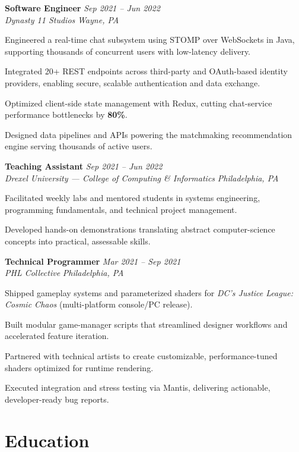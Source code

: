 \documentclass[letterpaper,10pt]{article}
\newcommand{\role}[4]{%
  \textbf{#1} \hfill \textit{#3}\\[-1pt]
  \textit{#2} \hfill \textit{#4}\par\vspace{2pt}
}
\begin{document}
\role{Software Engineer}{Dynasty 11 Studios}{Sep 2021 -- Jun 2022}{Wayne, PA}
\begin{tightitemize}
  \item Engineered a real-time chat subsystem using STOMP over WebSockets in Java, supporting thousands of concurrent users with low-latency delivery.
  \item Integrated 20+ REST endpoints across third-party and OAuth-based identity providers, enabling secure, scalable authentication and data exchange.
  \item Optimized client-side state management with Redux, cutting chat-service performance bottlenecks by \textbf{80\%}.
  \item Designed data pipelines and APIs powering the matchmaking recommendation engine serving thousands of active users.
\end{tightitemize}

\role{Teaching Assistant}{Drexel University --- College of Computing \& Informatics}{Sep 2021 -- Jun 2022}{Philadelphia, PA}
\begin{tightitemize}
  \item Facilitated weekly labs and mentored students in systems engineering, programming fundamentals, and technical project management.
  \item Developed hands-on demonstrations translating abstract computer-science concepts into practical, assessable skills.
\end{tightitemize}

\role{Technical Programmer}{PHL Collective}{Mar 2021 -- Sep 2021}{Philadelphia, PA}
\begin{tightitemize}
  \item Shipped gameplay systems and parameterized shaders for \textit{DC's Justice League: Cosmic Chaos} (multi-platform console/PC release).
  \item Built modular game-manager scripts that streamlined designer workflows and accelerated feature iteration.
  \item Partnered with technical artists to create customizable, performance-tuned shaders optimized for runtime rendering.
  \item Executed integration and stress testing via Mantis, delivering actionable, developer-ready bug reports.
\end{tightitemize}

\section*{Education}
\end{document}
